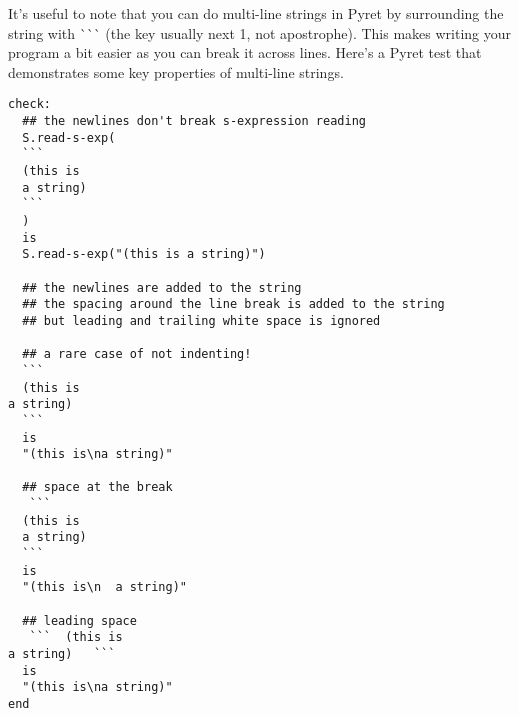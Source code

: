 \documentclass[10pt]{article}
\begin{document}
It's useful to note that you can do multi-line strings in Pyret by surrounding the string with  \`{}\`{}\`{} (the key usually next 1, not apostrophe). This makes writing your program a bit easier as you can break it across lines. Here's a Pyret test that demonstrates some key properties of multi-line strings.

\begin{verbatim}
check:
  ## the newlines don't break s-expression reading
  S.read-s-exp(
  ``` 
  (this is 
  a string)
  ```
  )
  is
  S.read-s-exp("(this is a string)")
  
  ## the newlines are added to the string
  ## the spacing around the line break is added to the string
  ## but leading and trailing white space is ignored
  
  ## a rare case of not indenting!
  ``` 
  (this is
a string)
  ```
  is
  "(this is\na string)"
  
  ## space at the break
   ``` 
  (this is
  a string)
  ```
  is
  "(this is\n  a string)"
  
  ## leading space
   ```  (this is
a string)   ```
  is
  "(this is\na string)"
end
\end{verbatim}
\end{document}

